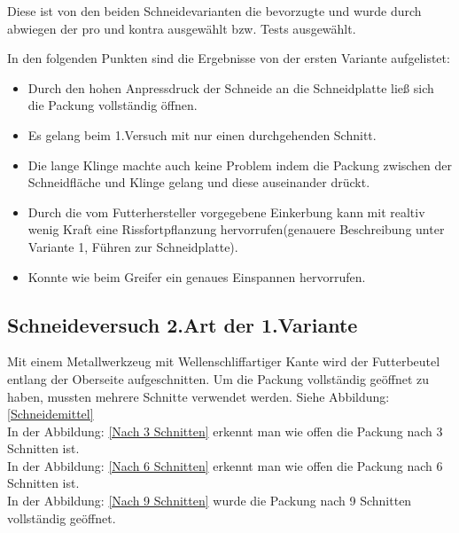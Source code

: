 Diese ist von den beiden Schneidevarianten die bevorzugte und wurde durch  abwiegen der pro und kontra ausgewählt bzw. Tests ausgewählt.

In den folgenden Punkten sind die Ergebnisse von der ersten Variante aufgelistet:

\begin{itemize}
\item Durch den hohen Anpressdruck der Schneide an die Schneidplatte ließ sich die Packung vollständig öffnen.
\item Es gelang beim 1.Versuch mit nur einen durchgehenden Schnitt.
\item Die lange Klinge machte auch keine Problem indem die Packung zwischen der Schneidfläche und Klinge gelang und diese auseinander drückt.
\item Durch die vom Futterhersteller vorgegebene Einkerbung kann mit realtiv wenig Kraft eine Rissfortpflanzung hervorrufen(genauere Beschreibung unter Variante 1, Führen zur Schneidplatte).
\item Konnte wie beim Greifer ein genaues Einspannen hervorrufen.
\end{itemize} 

\subsection{Schneideversuch 2.Art der 1.Variante}

Mit einem Metallwerkzeug mit Wellenschliffartiger Kante wird der Futterbeutel entlang der Oberseite aufgeschnitten. Um die Packung vollständig geöffnet zu haben, mussten mehrere Schnitte verwendet werden. Siehe Abbildung: \ref{Schneidemittel}\\
In der Abbildung: \ref{Nach 3 Schnitten} erkennt man wie offen die Packung nach 3 Schnitten ist.\\
In der Abbildung: \ref{Nach 6 Schnitten} erkennt man wie offen die Packung nach 6 Schnitten ist.\\
In der Abbildung: \ref{Nach 9 Schnitten} wurde die Packung nach 9 Schnitten vollständig geöffnet.


